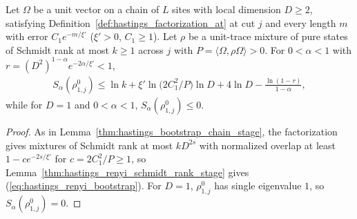 \begin{lemma}
    \label{thm:hastings_renyi_bootstrap_factorization_at}
    \leanok
    Let $\Omega$ be a unit vector on a chain of $L$ sites with local dimension
    $D\ge2$, satisfying Definition~\ref{def:hastings_factorization_at} at cut
    $j$ and every length $m$ with error $C_1e^{-m/\xi'}$ ($\xi'>0$, $C_1\ge1$).
    Let $\rho$ be a unit-trace mixture of pure states of Schmidt rank at most
    $k\ge1$ across $j$ with $P=\langle\Omega,\rho\Omega\rangle>0$. For
    $0<\alpha<1$ with $r=(D^2)^{1-\alpha}e^{-2\alpha/\xi'}<1$,
    \begin{align}
        S_\alpha(\rho^0_{1,j})\le\ln k+\xi'\ln\bigl(2C_1^2/P\bigr)\ln D+4\ln D
        -\frac{\ln(1-r)}{1-\alpha},
        \label{eq:hastings_renyi_bootstrap}
    \end{align}
    while for $D=1$ and $0<\alpha<1$, $S_\alpha(\rho^0_{1,j})\le0$.
\end{lemma}
\begin{proof}\leanok
    As in Lemma~\ref{thm:hastings_bootstrap_chain_stage}, the factorization
    gives mixtures of Schmidt rank at most $kD^{2s}$ with normalized overlap at
    least $1-ce^{-2s/\xi'}$ for $c=2C_1^2/P\ge1$, so
    Lemma~\ref{thm:hastings_renyi_schmidt_rank_stage} gives
    (\ref{eq:hastings_renyi_bootstrap}). For $D=1$, $\rho^0_{1,j}$ has
    single eigenvalue $1$, so $S_\alpha(\rho^0_{1,j})=0$.
\end{proof}


